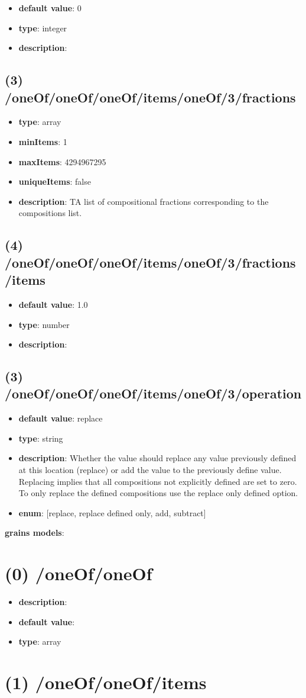 \begin{itemize}[leftmargin=4em]\item {\bf default value}: 0
\item {\bf type}: integer
\item {\bf description}: 
\end{itemize}\subsection{(3) /oneOf/oneOf/oneOf/items/oneOf/3/fractions}
\begin{itemize}[leftmargin=3em]\item {\bf type}: array
\item {\bf minItems}: 1
\item {\bf maxItems}: 4294967295
\item {\bf uniqueItems}: false
\item {\bf description}: TA list of compositional fractions corresponding to the compositions list.
\end{itemize}\subsection{(4) /oneOf/oneOf/oneOf/items/oneOf/3/fractions/items}
\begin{itemize}[leftmargin=4em]\item {\bf default value}: 1.0
\item {\bf type}: number
\item {\bf description}: 
\end{itemize}\subsection{(3) /oneOf/oneOf/oneOf/items/oneOf/3/operation}
\begin{itemize}[leftmargin=3em]\item {\bf default value}: replace
\item {\bf type}: string
\item {\bf description}: Whether the value should replace any value previously defined at this location (replace) or add the value to the previously define value. Replacing implies that all compositions not explicitly defined are set to zero. To only replace the defined compositions use the replace only defined option.
\item {\bf enum}: [replace, replace defined only, add, subtract]\end{itemize}\item {\bf grains models}: \section{(0) /oneOf/oneOf}
\begin{itemize}[leftmargin=0em]\item {\bf description}: 
\item {\bf default value}: 
\item {\bf type}: array
\end{itemize}\section{(1) /oneOf/oneOf/items}

